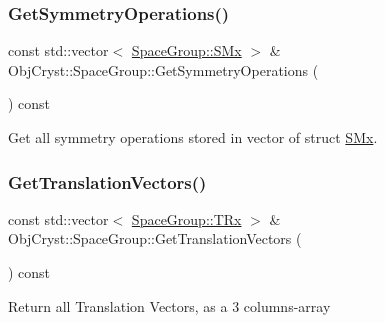 \subsubsection{\texorpdfstring{GetSymmetryOperations()}{GetSymmetryOperations()}}
{\footnotesize\ttfamily const std\+::vector$<$ \mbox{\hyperlink{struct_obj_cryst_1_1_space_group_1_1_s_mx}{Space\+Group\+::\+S\+Mx}} $>$ \& Obj\+Cryst\+::\+Space\+Group\+::\+Get\+Symmetry\+Operations (\begin{DoxyParamCaption}{ }\end{DoxyParamCaption}) const}

Get all symmetry operations stored in vector of struct \mbox{\hyperlink{struct_obj_cryst_1_1_space_group_1_1_s_mx}{S\+Mx}}. \mbox{\label{class_obj_cryst_1_1_space_group_af0ee74eb5826d86a67e70a6113b7b34d}} 
\subsubsection{\texorpdfstring{GetTranslationVectors()}{GetTranslationVectors()}}
{\footnotesize\ttfamily const std\+::vector$<$ \mbox{\hyperlink{struct_obj_cryst_1_1_space_group_1_1_t_rx}{Space\+Group\+::\+T\+Rx}} $>$ \& Obj\+Cryst\+::\+Space\+Group\+::\+Get\+Translation\+Vectors (\begin{DoxyParamCaption}{ }\end{DoxyParamCaption}) const}

Return all Translation Vectors, as a 3 columns-\/array

